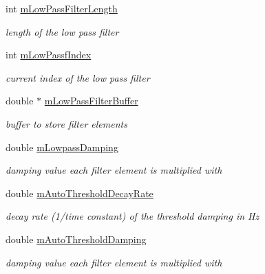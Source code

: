 \begin{DoxyCompactItemize}
int \hyperlink{classMorseDecode_a863b8dfbb16d6017fa41ca4aba30e4e5}{m\+Low\+Pass\+Filter\+Length}
\begin{DoxyCompactList}\small\item\em length of the low pass filter \end{DoxyCompactList}\item 
\mbox{\label{classMorseDecode_a3f07851804bb8a61d51e26c02f2e175d}} 
int \hyperlink{classMorseDecode_a3f07851804bb8a61d51e26c02f2e175d}{m\+Low\+Passf\+Index}
\begin{DoxyCompactList}\small\item\em current index of the low pass filter \end{DoxyCompactList}\item 
\mbox{\label{classMorseDecode_ac9eb40f85100d73cecd36164ac5344e3}} 
double $\ast$ \hyperlink{classMorseDecode_ac9eb40f85100d73cecd36164ac5344e3}{m\+Low\+Pass\+Filter\+Buffer}
\begin{DoxyCompactList}\small\item\em buffer to store filter elements \end{DoxyCompactList}\item 
\mbox{\label{classMorseDecode_acd234ffaeaf179f298be96d841e6e93e}} 
double \hyperlink{classMorseDecode_acd234ffaeaf179f298be96d841e6e93e}{m\+Lowpass\+Damping}
\begin{DoxyCompactList}\small\item\em damping value each filter element is multiplied with \end{DoxyCompactList}\item 
\mbox{\label{classMorseDecode_a35d6adcb3d15cc6b5828c50ed8c9e55b}} 
double \hyperlink{classMorseDecode_a35d6adcb3d15cc6b5828c50ed8c9e55b}{m\+Auto\+Threshold\+Decay\+Rate}
\begin{DoxyCompactList}\small\item\em decay rate (1/time constant) of the threshold damping in Hz \end{DoxyCompactList}\item 
\mbox{\label{classMorseDecode_a7d3a73d4ac6f0a4facf3f4f1bdd018d0}} 
double \hyperlink{classMorseDecode_a7d3a73d4ac6f0a4facf3f4f1bdd018d0}{m\+Auto\+Threshold\+Damping}
\begin{DoxyCompactList}\small\item\em damping value each filter element is multiplied with \end{DoxyCompactList}\item 

\end{DoxyCompactItemize}
